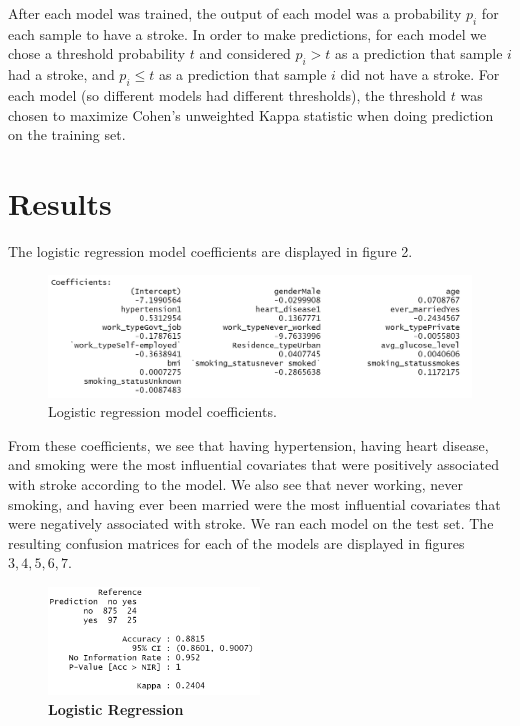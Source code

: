 \documentclass{article}
\begin{document}
After each model was trained, the output of each model was a probability $p_i$ for each sample to have a stroke. In order to make predictions, for each model we chose a threshold probability $t$ and considered $p_i > t$ as a prediction that sample $i$ had a stroke, and $p_i \leq t$ as a prediction that sample $i$ did not have a stroke. For each model (so different models had different thresholds), the threshold $t$ was chosen to maximize Cohen's unweighted Kappa statistic when doing prediction on the training set. 

\section{Results}

The logistic regression model coefficients are displayed in figure 2.

\begin{figure}[h]
\caption{Logistic regression model coefficients.}
\centering
\includegraphics[width = \textwidth]{logRegCoeffs.png}
\end{figure}

From these coefficients, we see that having hypertension, having heart disease, and smoking were the most influential covariates that were positively associated with stroke according to the model. We also see that never working, never smoking, and having ever been married were the most influential covariates that were negatively associated with stroke. We ran each model on the test set. The resulting confusion matrices for each of the models are displayed in figures $3, 4, 5, 6, 7$.

\begin{figure}[h]
\caption{\textbf{Logistic Regression}}
\centering
\includegraphics[width = 0.5\textwidth]{logRegCmtx.png}
\end{figure}
\end{document}
